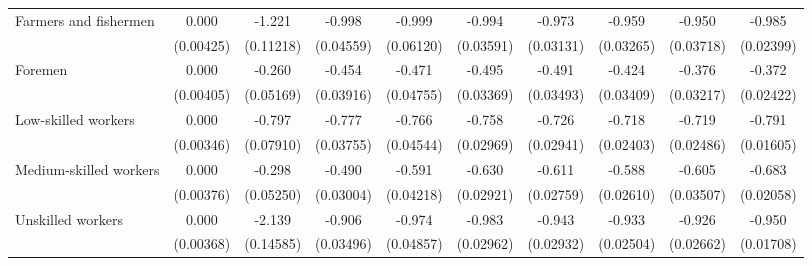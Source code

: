 {\begin{tabular}{l*{9}{c}}
Farmers and fishermen&       0.000         &      -1.221\sym{***}&      -0.998\sym{***}&      -0.999\sym{***}&      -0.994\sym{***}&      -0.973\sym{***}&      -0.959\sym{***}&      -0.950\sym{***}&      -0.985\sym{***}\\
                    &   (0.00425)         &   (0.11218)         &   (0.04559)         &   (0.06120)         &   (0.03591)         &   (0.03131)         &   (0.03265)         &   (0.03718)         &   (0.02399)         \\
Foremen             &       0.000         &      -0.260\sym{***}&      -0.454\sym{***}&      -0.471\sym{***}&      -0.495\sym{***}&      -0.491\sym{***}&      -0.424\sym{***}&      -0.376\sym{***}&      -0.372\sym{***}\\
                    &   (0.00405)         &   (0.05169)         &   (0.03916)         &   (0.04755)         &   (0.03369)         &   (0.03493)         &   (0.03409)         &   (0.03217)         &   (0.02422)         \\
Low-skilled workers &       0.000         &      -0.797\sym{***}&      -0.777\sym{***}&      -0.766\sym{***}&      -0.758\sym{***}&      -0.726\sym{***}&      -0.718\sym{***}&      -0.719\sym{***}&      -0.791\sym{***}\\
                    &   (0.00346)         &   (0.07910)         &   (0.03755)         &   (0.04544)         &   (0.02969)         &   (0.02941)         &   (0.02403)         &   (0.02486)         &   (0.01605)         \\
Medium-skilled workers&       0.000         &      -0.298\sym{***}&      -0.490\sym{***}&      -0.591\sym{***}&      -0.630\sym{***}&      -0.611\sym{***}&      -0.588\sym{***}&      -0.605\sym{***}&      -0.683\sym{***}\\
                    &   (0.00376)         &   (0.05250)         &   (0.03004)         &   (0.04218)         &   (0.02921)         &   (0.02759)         &   (0.02610)         &   (0.03507)         &   (0.02058)         \\
Unskilled workers   &       0.000         &      -2.139\sym{***}&      -0.906\sym{***}&      -0.974\sym{***}&      -0.983\sym{***}&      -0.943\sym{***}&      -0.933\sym{***}&      -0.926\sym{***}&      -0.950\sym{***}\\
                    &   (0.00368)         &   (0.14585)         &   (0.03496)         &   (0.04857)         &   (0.02962)         &   (0.02932)         &   (0.02504)         &   (0.02662)         &   (0.01708)         \\

\end{tabular}}
